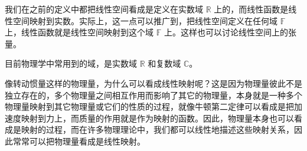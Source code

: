 我们在之前的定义中都把线性空间看成是定义在实数域 $\mathbb{R}$ 上的，而线性函数是线性空间映射到实数。实际上，这一点可以推广到，把线性空间定义在任何域 $\mathbb{F}$ 上，线性函数就是线性空间映射到这个域 $\mathbb{F}$ 上。这样也可以讨论线性空间上的张量。

目前物理学中常用到的域，是实数域 $\mathbb{R}$ 和复数域 $\mathbb{C}$。

像转动惯量这样的物理量，为什么可以看成线性映射呢？这是因为物理量彼此不是独立存在的，多个物理量之间相互作用而影响了其它的物理量，本身就是一种多个物理量映射到其它物理量或它们的性质的过程，就像牛顿第二定律可以看成是把加速度映射到力上，而质量的作用就是作为映射的函数。因此，物理量本身也可以看成是映射的过程，而在许多物理理论中，我们都可以线性地描述这些映射关系，因此常常可以把物理量看成是线性映射。
